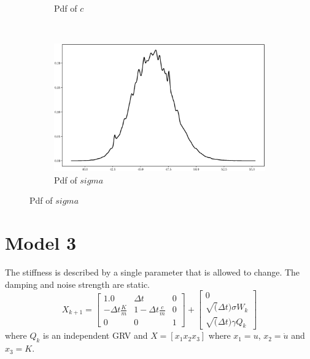 \documentclass[]{elsarticle}
\begin{document}
\begin{figure}[!htb]
\begin{subfigure}{.49\textwidth}
\caption{Pdf of $c$}
\label{fig:s1c}
\end{subfigure}\\
\begin{subfigure}{.49\textwidth}
\centering
\includegraphics[width=\linewidth,keepaspectratio]{./figs/Case00/Model2_sigma.eps}
\caption{Pdf of $sigma$}
\label{fig:s1d}
\end{subfigure}
\end{figure}

\section*{Model 3}

The stiffness is described by a single parameter that is allowed to change. The damping and noise strength are static.
\begin{equation}
X_{k+1} = 
\begin{bmatrix}
1.0 & \Delta t & 0 \\
- \Delta t \frac{K}{m} & 1 - \Delta t \frac{c}{m} & 0 \\
0 & 0 & 1 
\end{bmatrix}
+
\begin{bmatrix}
0 \\
\sqrt(\Delta t) \sigma W_k \\
\sqrt(\Delta t) \gamma Q_k
\end{bmatrix}
\end{equation}
where $Q_k$ is an independent GRV and $X = [x_1 x_2 x_3]$ where $x_1 = u$, $x_2 = \dot{u}$ and $x_3 = K$.
\end{document}
